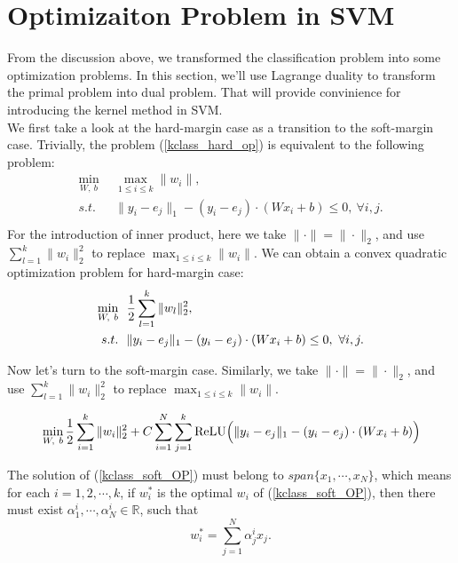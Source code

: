 \section{Optimizaiton Problem in SVM}
From the discussion above, we transformed the classification problem into some optimization problems. In this section, we'll use Lagrange duality to transform the primal  problem into dual problem.  That will provide convinience for introducing the kernel method in SVM.\\
We first take a look at the hard-margin case as a transition to the soft-margin case.  Trivially, the problem (\ref{kclass_hard_op}) is equivalent to the following problem:
\begin{equation}
\begin{aligned}
\min_{W,~b} ~~& \max_{1\leq i\leq k}\|w_i\|,\\
s.t.               ~~& \|y_i - e_j\|_1 - (y_i - e_j)\cdot (Wx_i+b)\leq 0,~\forall i,j.\\
\end{aligned}
\end{equation}
For the introduction of inner product, here we take $\|\cdot\|=\|\cdot\|_2$, and use $\displaystyle\sum_{l=1}^k \|w_i\|_2^2$ to replace $\max_{1\leq i\leq k}\|w_i\|$. We can obtain a convex quadratic optimization problem for hard-margin case:
\begin{equation}{\label{kclass_hard_CQP}}
\begin{aligned}
\min_{W,~b} ~~& \frac{1}{2}\displaystyle\sum_{l=1}^k \|w_l\|_2^2,\\
s.t.               ~~& \|y_i - e_j\|_1 - (y_i - e_j)\cdot (Wx_i+b)\leq 0,~\forall i,j.\\
\end{aligned}
\end{equation}

Now let's turn to the soft-margin case. Similarly, we take $\|\cdot\|=\|\cdot\|_2$, and use $\displaystyle\sum_{l=1}^k \|w_i\|_2^2$ to replace $\max_{1\leq i\leq k}\|w_i\|$.

\begin{equation}{\label{kclass_soft_OP}}
\min_{W,~b}  \frac{1}{2}\displaystyle\sum_{i=1}^k \|w_i\|_2^2 + C\displaystyle\sum_{i=1}^N\displaystyle\sum_{j=1}^k\text{ReLU}\Big(\|y_i - e_j\|_1 - (y_i - e_j)\cdot (Wx_i+b)\Big)
\end{equation}

\begin{theorem}
The solution of (\ref{kclass_soft_OP}) must belong to $span\{x_1,\cdots,x_N\}$, which means for each $i = 1,2,\cdots,k$, if $w_i^*$ is the optimal $w_i$ of (\ref{kclass_soft_OP}), then there must exist $\alpha_1^i,\cdots,\alpha_N^i\in \mathbb{R}$, such that  
\[
w_i^* = \sum_{j = 1}^N \alpha_j^i x_j.
\]
\end{theorem}

